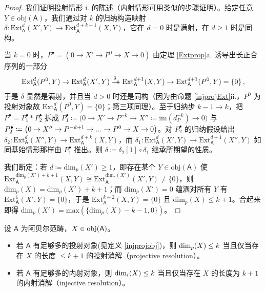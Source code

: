 \begin{proof}
	我们证明投射情形 i. 的陈述（内射情形可用类似的步骤证明）。给定任意 $Y\in\text{obj}(\mathsf{A})$，我们通过对 $k$ 的归纳构造映射 $\delta:\text{Ext}_\mathsf{A}^d(X',Y)\rightarrow\text{Ext}_\mathsf{A}^{d+k+1}(X,Y)$，它在 $d=0$ 时是满射，在 $d\geq 1$ 时是同构。
	
	当 $k=0$ 时，$P^\bullet=(0\rightarrow X'\rightarrow P^0\rightarrow X\rightarrow 0)$ 由定理 \ref{Extprop}a. 诱导出长正合序列的一部分
	\[
	\text{Ext}_\mathsf{A}^d(P^0,Y)\rightarrow\text{Ext}_\mathsf{A}^d(X',Y)\xrightarrow{\delta}\mkern-15mu\rightarrow\text{Ext}_\mathsf{A}^{d+1}(X,Y)\rightarrow\text{Ext}_\mathsf{A}^{d+1}(P^0,Y)=\{0\}\,,
	\]
	于是 $\delta$ 显然是满射，并且当 $d>0$ 时还是同构（因为由命题 \ref{injprojExt}ii.，$P^0$ 为投射对象故 $\text{Ext}_\mathsf{A}^d(P^0,Y)=\{0\}$；第三项同理）。至于归纳步 $k-1\rightarrow k$，把 $P^\bullet=P_1^\bullet\ast P_2^\bullet$ 拆成 $P_1^\bullet\coloneqq\big(0\rightarrow X'\rightarrow P^{-k}\rightarrow X''\coloneqq\text{im}(d_P^{-k})\rightarrow 0\big)$ 与 $P_2^\bullet\coloneqq\big(0\rightarrow X''\rightarrow\break P^{-k+1}\rightarrow...\rightarrow P^0\rightarrow X\rightarrow 0\big)$。对 $P_2^\bullet$ 的归纳假设给出 $\delta_2:\text{Ext}_\mathsf{A}^d(X'',Y)\rightarrow\text{Ext}_\mathsf{A}^{d+k}(X,Y)$，而 $\delta_1:\text{Ext}_\mathsf{A}^d(X',Y)\rightarrow\text{Ext}_\mathsf{A}^{d+1}(X'',Y)$ 如同基始情形那样由 $P_1^\bullet$ 推出。则 $\delta\coloneqq\delta_2[1]\circ\delta_1$ 继承所期望的性质。
	
	我们断定：若 $d\coloneqq\text{dim}_p(X')\geq 1$，即存在某个 $Y\in\text{obj}(\mathsf{A})$ 使 $\text{Ext}_\mathsf{A}^{\text{dim}_p(X')+k+1}(X,Y)\cong\text{Ext}_\mathsf{A}^{\text{dim}_p(X')}(X',Y)\neq\{0\}$，则 $\text{dim}_p(X)=\text{dim}_p(X')+k+1$；而 $\text{dim}_p(X')= 0$ 蕴涵对所有 $Y$ 有 $\text{Ext}_\mathsf{A}^1(X',Y)=\{0\}$，于是 $\text{Ext}_\mathsf{A}^{k+2}(X,Y)=\{0\}$ 且 $\text{dim}_p(X)\leq k+1$。合起来即得 $\text{dim}_p(X')=\text{max}(\{\text{dim}_p(X)-k-1,0\})$。 
\end{proof}

\begin{Cor}
	设 $\mathsf{A}$ 为阿贝尔范畴，$X\in\textup{obj}(\mathsf{A})$。
	\begin{itemize}[leftmargin=0.5cm]
		\item 若 $\mathsf{A}$ 有足够多的投射对象\textup(见定义 \ref{injprojobj}\textup)，则 $\textup{dim}_p(X)\leq k$ 当且仅当存在 $X$ 的长度 $\leq k+1$ 的投射消解（projective resolution）。
		
		\item 若 $\mathsf{A}$ 有足够多的内射对象，则 $\textup{dim}_i(X)\leq k$ 当且仅当存在 $X$ 的长度为 $k+1$ 的内射消解（injective resolution）。 
	\end{itemize} 
\end{Cor}

